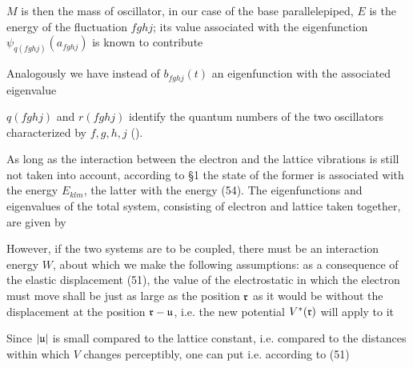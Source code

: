 \begin{paper}{1}
$M$ is then the mass of oscillator, in our case of the base parallelepiped, $E$ is the energy of the fluctuation $fghj$; its value associated with the eigenfunction $\psi_{q(fghj)}(a_{fghj})$ is known to contribute

Analogously we have instead of $b_{fghj}(t)$ an eigenfunction
with the associated eigenvalue

$q(fghj)$ and $r(fghj)$ identify the quantum numbers of the two oscillators characterized by $f,g,h,j$ ().

As long as the interaction between the electron and the lattice vibrations is still not taken into account, according to \S1 the state of the former is associated with the energy $E_{klm}$, the latter with the energy (54). The eigenfunctions and eigenvalues of the total system, consisting of electron and lattice taken together, are given by

However, if the two systems are to be coupled, there must be an interaction energy $W$, about which we make the following assumptions: as a consequence of the elastic displacement (51), the value of the electrostatic in which the electron must move shall be just as large as the position $\mathfrak{r}$ as it would be without the displacement at the position $\mathfrak{r}-\mathfrak{u}$, i.e. the new potential $V^*(\mathfrak{r})$ will apply to it

Since $|\mathfrak{u}|$ is small compared to the lattice constant, i.e. compared to the distances within which $V$ changes perceptibly, one can put
i.e. according to (51)


\end{paper}
